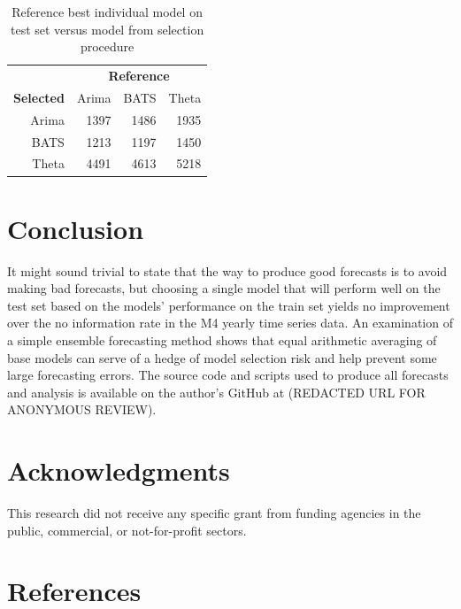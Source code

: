\documentclass[11pt,3p,review,authoryear]{elsarticle}
\begin{document}
\begin{table}[ht]
\centering
\begin{tabular}{rrrr}
  \hline
  & \multicolumn{3}{c}{\textbf{Reference}} \\
 \textbf{Selected} & Arima & BATS & Theta  \\
 \hline
 Arima & 1397 & 1486 & 1935 \\ 
   BATS & 1213 & 1197 & 1450 \\ 
  Theta & 4491 & 4613 & 5218 \\ 
   \hline
\end{tabular}
\caption{Reference best individual model on test set versus model from selection procedure}\label{tab:b}
\end{table}

\section{Conclusion}
It might sound trivial to state that the way to produce good forecasts is to avoid making bad forecasts, but choosing a single model that will perform well on the test set based on the models' performance on the train set yields no improvement over the no information rate in the M4 yearly time series data. An examination of a simple ensemble forecasting method shows that equal arithmetic averaging of base models can serve of a hedge of model selection risk and help prevent some large forecasting errors. The source code and scripts used to produce all forecasts and analysis is available on the author's GitHub at (REDACTED URL FOR ANONYMOUS REVIEW).

\section*{Acknowledgments}

This research did not receive any specific grant from funding agencies in the public, commercial, or not-for-profit sectors.


\section{References}

\end{document}
